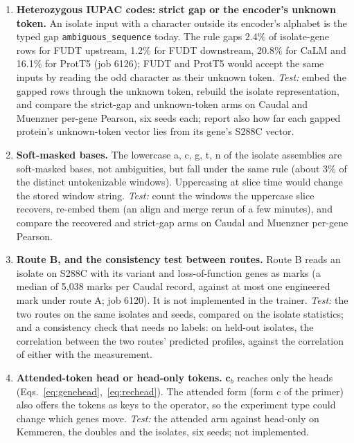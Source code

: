 \begin{enumerate}[leftmargin=*,itemsep=3pt]
\item \textbf{Heterozygous IUPAC codes: strict gap or the encoder's unknown token.} An isolate
input with a character outside its encoder's alphabet is the typed gap
\texttt{ambiguous\_sequence} today. The rule gaps 2.4\% of isolate-gene rows for FUDT
upstream, 1.2\% for FUDT downstream, 20.8\% for CaLM and 16.1\% for ProtT5 (job 6126); FUDT
and ProtT5 would accept the same inputs by reading the odd character as their unknown
token. \emph{Test:} embed the gapped rows through the unknown token, rebuild the isolate
representation, and compare the strict-gap and unknown-token arms on Caudal and Muenzner
per-gene Pearson, six seeds each; report also how far each gapped protein's unknown-token
vector lies from its gene's S288C vector.

\item \textbf{Soft-masked bases.} The lowercase a, c, g, t, n of the isolate assemblies are
soft-masked bases, not ambiguities, but fall under the same rule (about 3\% of the distinct
untokenizable windows). Uppercasing at slice time would change the stored window string.
\emph{Test:} count the windows the uppercase slice recovers, re-embed them (an align and
merge rerun of a few minutes), and compare the recovered and strict-gap arms on Caudal and
Muenzner per-gene Pearson.

\item \textbf{Route B, and the consistency test between routes.} Route B reads an isolate on
S288C with its variant and loss-of-function genes as marks (a median of 5{,}038 marks per
Caudal record, against at most one engineered mark under route A; job 6120). It is not
implemented in the trainer. \emph{Test:} the two routes on the same isolates and seeds,
compared on the isolate statistics; and a consistency check that needs no labels: on
held-out isolates, the correlation between the two routes' predicted profiles, against the
correlation of either with the measurement.

\item \textbf{Attended-token head or head-only tokens.} $\mathbf{c}_b$ reaches only the heads
(Eqs.~\ref{eq:genehead},~\ref{eq:rechead}). The attended form (form c of the primer) also
offers the tokens as keys to the operator, so the experiment type could change which genes
move. \emph{Test:} the attended arm against head-only on Kemmeren, the doubles and the
isolates, six seeds; not implemented.


\end{enumerate}
